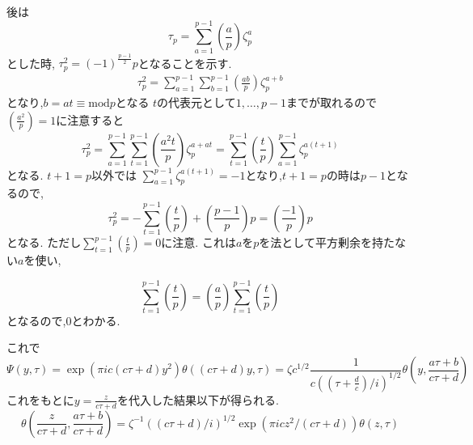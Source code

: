 後は
\begin{equation*}
\tau_{p}=\sum_{a=1}^{p-1}\left(\frac{a}{p}\right) \zeta_{p}^{a}
\end{equation*}
とした時,
$\tau_{p}^{2}=(-1)^{\frac{p-1}{2}} p$となることを示す.
\begin{align*}
\tau_{p}^2=\sum_{a=1}^{p-1} \sum_{b=1}^{p-1}\left(\frac{ab}{p}\right) \zeta_{p}^{a+b}
\end{align*}
となり,$b = at \equiv \mathrm{mod} p$となる
$t$の代表元として$1, \ldots, p-1$までが取れるので
$\left( \frac{a^2}{p} \right) =1$に注意すると
\begin{equation*}
\tau_{p}^{2}=\sum_{a=1}^{p-1} \sum_{t=1}^{p-1}\left(\frac{a^{2} t}{p}\right) \zeta_{p}^{a+a t}=\sum_{t=1}^{p-1}\left(\frac{t}{p}\right)
\sum_{a=1}^{p-1} \zeta_{p}^{a(t+1)}
\end{equation*}
となる.
$t+ 1 =p$以外では
$\sum_{a=1}^{p-1} \zeta_{p}^{a(t+1)} = -1$となり,$t+1=p$の時は$p-1$となるので,
\begin{equation}
\tau_{p}^{2}=-\sum_{t=1}^{p-1}\left(\frac{t}{p}\right)+\left(\frac{p-1}{p}\right) p=\left(\frac{-1}{p}\right) p
\end{equation}
となる.
ただし$\sum_{t=1}^{p-1}\left(\frac{t}{p}\right)  = 0$に注意.
これは$a$を$p$を法として平方剰余を持たない$a$を使い,

\begin{equation*}
\sum_{t=1}^{p-1}\left(\frac{t}{p}\right) = 
\left( \frac{a}{p}\right)
\sum_{t=1}^{p-1}\left(\frac{t}{p}\right)
\end{equation*}
となるので,0とわかる.


これで
\begin{equation*}
\Psi(y, \tau) = \exp(\pi i c (c\tau + d ) y^2) \theta( (c \tau + d)y, \tau) = \zeta c^{1/2} \frac{1}{ c ((\tau + \frac{d}{c} )/ i)^{1/2}} \theta(y, \frac{a \tau + b}{ c \tau + d})
\end{equation*}
これをもとに$y = \frac{z}{c \tau + d}$を代入した結果以下が得られる.
\begin{equation*}
\theta( \frac{z}{c \tau + d}, \frac{a \tau + b}{c \tau + d}) = \zeta^{-1}  ((c \tau + d)/i)^{1/2} \exp(\pi i c z^2/ (c \tau + d)) \theta(z, \tau)
\end{equation*}

